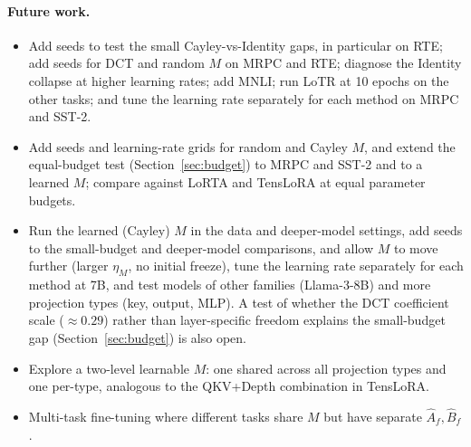 \documentclass{article}
\theoremstyle{plain}
\begin{document}
\paragraph{Future work.}
\begin{itemize}
  \item Add seeds to test the small Cayley-vs-Identity gaps, in particular on RTE; add seeds for DCT and random $M$ on MRPC and RTE;
        diagnose the Identity collapse at higher learning rates; add MNLI; run LoTR at 10 epochs on the other tasks; and tune the learning rate
        separately for each method on MRPC and SST-2.
  \item Add seeds and learning-rate grids for random and Cayley $M$, and extend the equal-budget test (Section~\ref{sec:budget}) to MRPC and SST-2 and to a learned $M$; compare against LoRTA and TensLoRA at equal parameter budgets.
  \item Run the learned (Cayley) $M$ in the data and deeper-model settings, add seeds to the small-budget and deeper-model comparisons, and allow $M$ to move further (larger $\eta_M$, no initial freeze), tune the learning rate separately for each method at 7B, and test models of other families (Llama-3-8B) and more projection types (key, output, MLP).
        A test of whether the DCT coefficient scale ($\approx0.29$) rather than layer-specific freedom explains the small-budget gap (Section~\ref{sec:budget}) is also open.
  \item Explore a two-level learnable $M$: one shared across all projection types
        and one per-type, analogous to the QKV+Depth combination in TensLoRA.
  \item Multi-task fine-tuning where different tasks share $M$ but have
        separate $\hat{A}_f, \hat{B}_f$.
\end{itemize}



\end{document}

